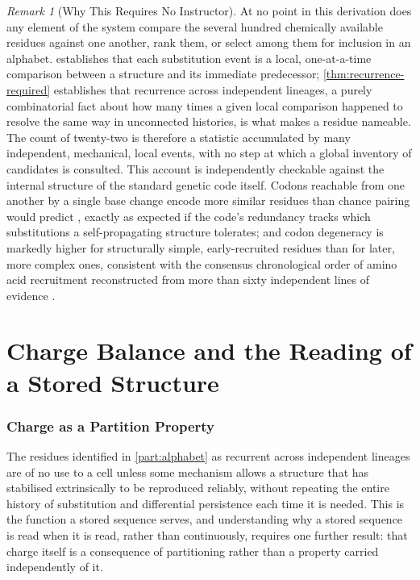 \documentclass[11pt,twocolumn,a4paper]{article}
\theoremstyle{plain}
\theoremstyle{definition}
\theoremstyle{remark}
\newtheorem{remark}[theorem]{Remark}
\begin{document}
\begin{remark}[Why This Requires No Instructor]
\label{rem:noinstructor}
At no point in this derivation does any element of the system compare the
several hundred chemically available residues against one another, rank
them, or select among them for inclusion in an alphabet. 
establishes that each substitution event is a local, one-at-a-time
comparison between a structure and its immediate predecessor;
\cref{thm:recurrence-required} establishes that recurrence across
independent lineages, a purely combinatorial fact about how many times a
given local comparison happened to resolve the same way in unconnected
histories, is what makes a residue nameable. The count of twenty-two is
therefore a statistic accumulated by many independent, mechanical, local
events, with no step at which a global inventory of candidates is
consulted. This account is independently checkable against the internal
structure of the standard genetic code itself. Codons reachable from one
another by a single base change encode more similar residues than chance
pairing would predict \citep{crick1968,freeland1998}, exactly as expected
if the code's redundancy tracks which substitutions a self-propagating
structure tolerates; and codon degeneracy is markedly higher for
structurally simple, early-recruited residues than for later, more complex
ones, consistent with the consensus chronological order of amino acid
recruitment reconstructed from more than sixty independent lines of
evidence \citep{trifonov2000,wong1975}.
\end{remark}

\part{Charge Balance and the Reading of a Stored Structure}
\label{part:reading}

\section{Charge as a Partition Property}
\label{sec:charge}

The residues identified in \cref{part:alphabet} as recurrent across
independent lineages are of no use to a cell unless some mechanism allows a
structure that has stabilised extrinsically to be reproduced reliably,
without repeating the entire history of substitution and differential
persistence each time it is needed. This is the function a stored sequence
serves, and understanding why a stored sequence is read when it is read,
rather than continuously, requires one further result: that charge itself is
a consequence of partitioning rather than a property carried independently
of it.
\end{document}

